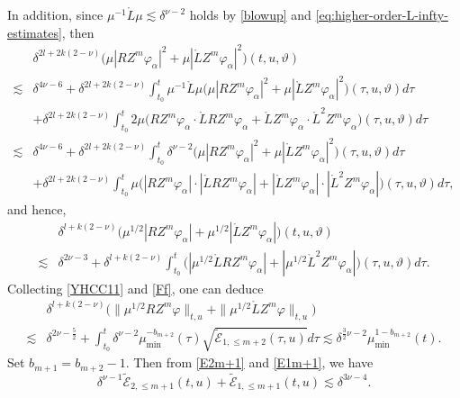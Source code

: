 \documentclass[11pt,twoside]{article}
\def\al{\alpha}
\def\vp{\varphi}
\def\f{\frac}
\begin{document}
In addition, since $\mu^{-1}\mathring L\mu\lesssim\delta^{\nu-2}$ holds by \eqref{blowup} and \eqref{eq:higher-order-L-infty-estimates},
then
\begin{equation*}
\begin{split}
&\delta^{2l+2k(2-\nu)}\bigl(\mu|RZ^m\vp_\al|^2+\mu|\mathring LZ^m\vp_\al|^2\bigr)(t,u,\vartheta)\\
\lesssim&\delta^{4\nu-6}+\delta^{2l+2k(2-\nu)}\int_{t_0}^t\mu^{-1}\mathring L\mu\bigl(\mu|RZ^m\vp_\al|^2+\mu|\mathring LZ^m\vp_\al|^2\bigr)(\tau,u,\vartheta)d\tau\\
&+\delta^{2l+2k(2-\nu)}\int_{t_0}^t2\mu\bigl(RZ^m\vp_\al\cdot\mathring LRZ^m\vp_\al+\mathring LZ^m\vp_\al\cdot\mathring L^2Z^m\vp_\al\bigr)(\tau,u,\vartheta)d\tau\\
\lesssim&\delta^{4\nu-6}+\delta^{2l+2k(2-\nu)}\int_{t_0}^t\delta^{\nu-2}\bigl(\mu|RZ^m\vp_\al|^2+\mu|\mathring LZ^m\vp_\al|^2\bigr)(\tau,u,\vartheta)d\tau\\
&+\delta^{2l+2k(2-\nu)}\int_{t_0}^t\mu\bigl(|RZ^m\vp_\al|\cdot|\mathring LRZ^m\vp_\al|+|\mathring LZ^m\vp_\al|\cdot|\mathring L^2Z^m\vp_\al|\bigr)(\tau,u,\vartheta)d\tau,
\end{split}
\end{equation*}
and hence,
\begin{equation}\label{YHCC11}
\begin{split}
&\delta^{l+k(2-\nu)}\bigl(\mu^{1/2}|RZ^m\vp_\al|+\mu^{1/2}|\mathring LZ^m\vp_\al|\bigr)(t,u,\vartheta)\\
\lesssim&\delta^{2\nu-3}+\delta^{l+k(2-\nu)}\int_{t_0}^t\bigl(|\mu^{1/2}\mathring LRZ^m\vp_\al|+|\mu^{1/2}\mathring L^2Z^m\vp_\al|\bigr)(\tau,u,\vartheta)d\tau.
\end{split}
\end{equation}
Collecting \eqref{YHCC11} and \eqref{Ff}, one can deduce
\begin{equation}\label{E1m+1}
\begin{split}
&\delta^{l+k(2-\nu)}\bigl(\|\mu^{1/2}RZ^m\vp\|_{t,u}+\|\mu^{1/2}\mathring LZ^m\vp\|_{t,u}\bigr)\\
\lesssim&\delta^{2\nu-\f52}+\int_{t_0}^t\delta^{\nu-2}\mu_{\min}^{-b_{m+2}}(\tau)\sqrt{\tilde{\mathcal E}_{1,\leq m+2}(\tau,u)}d\tau\lesssim\delta^{\f32\nu-2}\mu_{\min}^{1-b_{m+2}}(t).
\end{split}
\end{equation}
Set $b_{m+1} = b_{m+2} - 1$. Then from \eqref{E2m+1} and \eqref{E1m+1}, we have
\[
\delta^{\nu-1} \widetilde{\mathcal{E}}_{2,\leq m+1}(t,u) + \widetilde{\mathcal{E}}_{1,\leq m+1}(t,u) \lesssim \delta^{3\nu-4}.
\]
\end{document}
